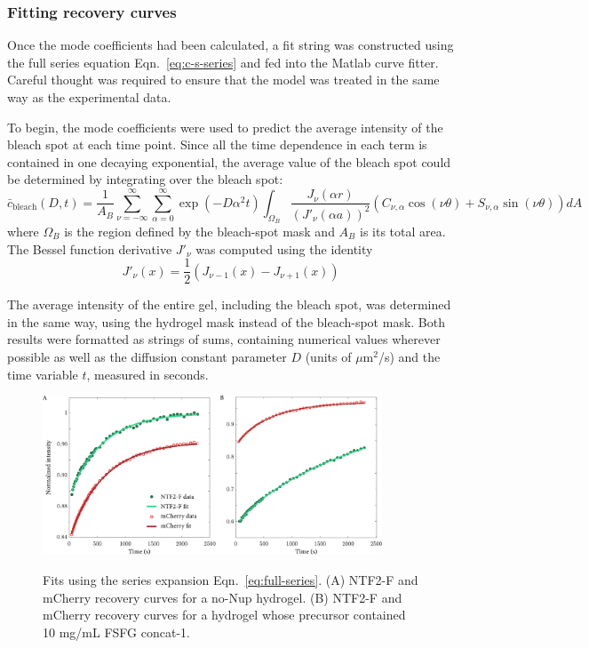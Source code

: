 \subsubsection{Fitting recovery curves}

Once the mode coefficients had been calculated, a fit string was constructed using the full series equation Eqn.~\ref{eq:c-s-series} and fed into the Matlab curve fitter.  Careful thought was required to ensure that the model was treated in the same way as the experimental data.

To begin, the mode coefficients were used to predict the average intensity of the bleach spot at each time point.  Since all the time dependence in each term is contained in one decaying exponential, the average value of the bleach spot could be determined by integrating over the bleach spot:
\begin{equation}
\bar{c}_\mathrm{bleach}(D,t) = \frac{1}{A_B}\sum_{\nu=-\infty}^{\infty} \sum_{\alpha = 0}^\infty   \exp\left(-D\alpha^2t\right)\int_{\Omega_B}\frac{J_\nu\left(\alpha r\right)}{\left(J'_\nu (\alpha a)\right)^2} \left(C_{\nu,\alpha}\cos(\nu\theta) + S_{\nu,\alpha} \sin(\nu\theta)\right) dA
\label{eq:c-s-series}
\end{equation}
where $\Omega_B$ is the region defined by the bleach-spot mask and $A_B$ is its total area.  The Bessel function derivative $J'_\nu$ was computed using the identity
\begin{equation*}
J'_\nu(x) = \frac{1}{2}\left(J_{\nu-1}(x) - J_{\nu+1}(x)\right)
\end{equation*}

The average intensity of the entire gel, including the bleach spot, was determined in the same way, using the hydrogel mask instead of the bleach-spot mask.  Both results were formatted as strings of sums, containing numerical values wherever possible as well as the diffusion constant parameter $D$ (units of $\mu$m$^2$/s)  and the time variable $t$, measured in seconds.
\begin{figure}
\caption[Fits to recovery curves using Fourier transform solution.]{Fits using the series expansion Eqn.~\ref{eq:full-series}. (A) NTF2-F and mCherry recovery curves for a no-Nup hydrogel.  (B) NTF2-F and mCherry recovery curves for a hydrogel whose precursor contained 10 mg/mL FSFG concat-1.}
\centering
\includegraphics[width=0.9\textwidth]{figs/ch04/series-fits.pdf}
\label{fig:series-fits}
\end{figure} 

